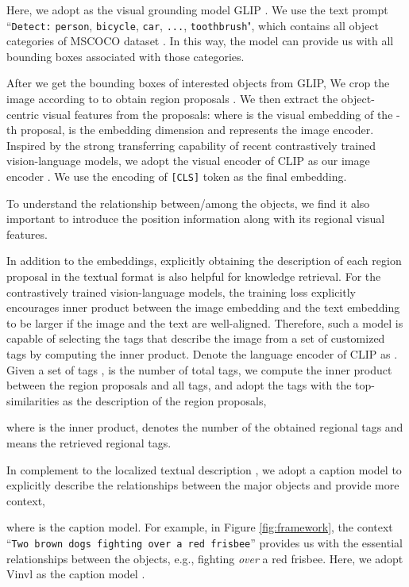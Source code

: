 \documentclass{article}
\begin{document}
Here, we adopt  as the visual grounding model GLIP \cite{li2021grounded}. We use the text prompt ``\texttt{Detect:} \texttt{person}, \texttt{bicycle}, \texttt{car}, \texttt{...}, \texttt{toothbrush}", which contains all object categories of MSCOCO dataset \cite{lin2014microsoft}. In this way, the model can provide us with all bounding boxes associated with those categories. 

After we get the bounding boxes  of interested objects from GLIP, 
We crop the image  according to  to obtain region proposals . We then extract the object-centric visual features from the proposals:  where  is the visual embedding of the -th proposal,  is the embedding dimension and  represents the image encoder. Inspired by the strong transferring capability of recent contrastively trained vision-language models, we adopt the visual encoder of CLIP \cite{radford2021learning} as our image encoder . We use the encoding of \texttt{[CLS]} token as the final embedding. 

To understand the relationship between/among the objects, we find it also important to introduce the position information  along with its regional visual features.

In addition to the embeddings, explicitly obtaining the description of each region proposal in the textual format is also helpful for knowledge retrieval. For the contrastively trained vision-language models, the training loss explicitly encourages inner product between the image embedding and the text embedding to be larger if the image and the text are well-aligned. Therefore, such a model is capable of selecting the tags that describe the image from a set of customized tags  by computing the inner product. Denote the language encoder of CLIP as . Given a set of tags ,  is the number of total tags, we compute the inner product between the region proposals and all tags, and adopt the tags with the top- similarities as the description of the region proposals,


where  is the inner product,  denotes the number of the obtained regional tags and  means the retrieved regional tags.

In complement to the localized textual description , we adopt a caption model to explicitly describe the relationships between the major objects and provide more context,

where  is the caption model. For example, in Figure \ref{fig:framework}, the context ``\texttt{Two brown dogs fighting over a red frisbee}'' provides us with the essential relationships between the objects, e.g., fighting \textit{over} a red frisbee. Here, we adopt Vinvl \cite{zhang2021vinvl} as the caption model .
\end{document}
